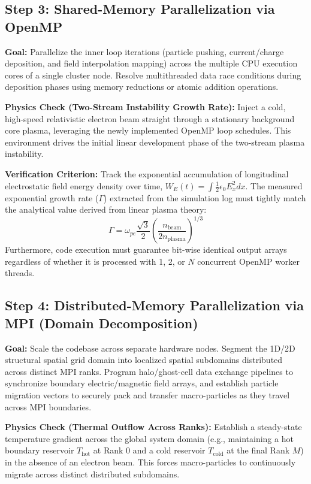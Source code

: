 \documentclass[11pt,a4paper]{article}
\begin{document}
\subsection{Step 3: Shared-Memory Parallelization via OpenMP}
\textbf{Goal:} Parallelize the inner loop iterations (particle pushing, current/charge deposition, and field interpolation mapping) across the multiple CPU execution cores of a single cluster node. Resolve multithreaded data race conditions during deposition phases using memory reductions or atomic addition operations.

\medskip
\noindent\textbf{Physics Check (Two-Stream Instability Growth Rate):} Inject a cold, high-speed relativistic electron beam straight through a stationary background core plasma, leveraging the newly implemented OpenMP loop schedules. This environment drives the initial linear development phase of the two-stream plasma instability.

\medskip
\noindent\textbf{Verification Criterion:} Track the exponential accumulation of longitudinal electrostatic field energy density over time, \(W_E(t) = \int \frac{1}{2}\epsilon_0 E_x^2 dx\). The measured exponential growth rate (\(\Gamma\)) extracted from the simulation log must tightly match the analytical value derived from linear plasma theory:
\begin{equation}
\Gamma = \omega_{pe} \frac{\sqrt{3}}{2} \left(\frac{n_{\text{beam}}}{2 n_{\text{plasma}}}\right)^{1/3}
\end{equation}
Furthermore, code execution must guarantee bit-wise identical output arrays regardless of whether it is processed with 1, 2, or \(N\) concurrent OpenMP worker threads.

\subsection{Step 4: Distributed-Memory Parallelization via MPI (Domain Decomposition)}
\textbf{Goal:} Scale the codebase across separate hardware nodes. Segment the 1D/2D structural spatial grid domain into localized spatial subdomains distributed across distinct MPI ranks. Program halo/ghost-cell data exchange pipelines to synchronize boundary electric/magnetic field arrays, and establish particle migration vectors to securely pack and transfer macro-particles as they travel across MPI boundaries.

\medskip
\noindent\textbf{Physics Check (Thermal Outflow Across Ranks):} Establish a steady-state temperature gradient across the global system domain (e.g., maintaining a hot boundary reservoir \(T_{\text{hot}}\) at Rank 0 and a cold reservoir \(T_{\text{cold}}\) at the final Rank \(M\)) in the absence of an electron beam. This forces macro-particles to continuously migrate across distinct distributed subdomains.
\end{document}
